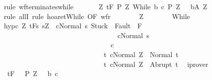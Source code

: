 \begin{isabellebody}
\ {\isacharparenleft}rule\ wf{\isacharunderscore}terminates{\isacharunderscore}while{\isacharparenright}\isanewline
\ \ \ \ \isamarkupfalse%
\ {\isachardoublequoteopen}{\isasymforall}\ Z{\isachardot}\ {\isasymGamma}{\isacharcomma}{\isasymTheta}{\isasymturnstile}\isactrlsub t\isactrlbsub {\isacharslash}F\isactrlesub \ {\isacharparenleft}{\isacharquery}P{\isacharprime}\ Z{\isacharparenright}\ {\isacharparenleft}While\ b\ c{\isacharparenright}\ {\isacharparenleft}{\isacharquery}P{\isacharprime}\ Z\ {\isasyminter}\ {\isacharminus}\ b{\isacharparenright}{\isacharcomma}{\isacharparenleft}{\isacharquery}A\ Z{\isacharparenright}{\isachardoublequoteclose}\isanewline
\ \ \ \ \isamarkupfalse%
\ {\isacharparenleft}rule\ allI{\isacharcomma}\ rule\ hoaret{\isachardot}While\ {\isacharbrackleft}OF\ wf{\isacharunderscore}r{\isacharbrackright}{\isacharparenright}\isanewline
\ \ \ \ \ \ \isamarkupfalse%
\ Z\isanewline
\ \ \ \ \ \ \isamarkupfalse%
\ While\ \isanewline
\ \ \ \ \ \ \isamarkupfalse%
\ hyp{\isacharunderscore}c{\isacharcolon}\ {\isachardoublequoteopen}{\isasymforall}Z{\isachardot}\ {\isasymGamma}{\isacharcomma}{\isasymTheta}{\isasymturnstile}\isactrlsub t\isactrlbsub {\isacharslash}F\isactrlesub {\isacharbraceleft}s{\isachardot}\ s{\isacharequal}Z\ {\isasymand}\ {\isasymGamma}{\isasymturnstile}{\isasymlangle}c{\isacharcomma}Normal\ s{\isasymrangle}\ {\isasymRightarrow}{\isasymnotin}{\isacharparenleft}{\isacharbraceleft}Stuck{\isacharbraceright}\ {\isasymunion}\ Fault\ {\isacharbackquote}\ {\isacharparenleft}{\isacharminus}F{\isacharparenright}{\isacharparenright}\ {\isasymand}\isanewline
\ \ \ \ \ \ \ \ \ \ \ \ \ \ \ \ \ \ \ \ \ \ \ \ \ \ \ \ \ \ \ \ \ \ {\isasymGamma}{\isasymturnstile}c{\isasymdown}Normal\ s{\isacharbraceright}\isanewline
\ \ \ \ \ \ \ \ \ \ \ \ \ \ \ \ \ \ \ \ \ \ \ \ \ \ \ \ \ \ \ \ c\isanewline
\ \ \ \ \ \ \ \ \ \ \ \ \ \ \ \ \ \ \ \ \ \ \ \ \ \ \ \ \ \ {\isacharbraceleft}t{\isachardot}\ {\isasymGamma}{\isasymturnstile}{\isasymlangle}c{\isacharcomma}Normal\ Z{\isasymrangle}\ {\isasymRightarrow}\ Normal\ t{\isacharbraceright}{\isacharcomma}\isanewline
\ \ \ \ \ \ \ \ \ \ \ \ \ \ \ \ \ \ \ \ \ \ \ \ \ \ \ \ \ \ {\isacharbraceleft}t{\isachardot}\ {\isasymGamma}{\isasymturnstile}{\isasymlangle}c{\isacharcomma}Normal\ Z{\isasymrangle}\ {\isasymRightarrow}\ Abrupt\ t{\isacharbraceright}{\isachardoublequoteclose}\ \isamarkupfalse%
\ iprover\isanewline
\ \ \ \ \ \ \isamarkupfalse%
\ {\isachardoublequoteopen}{\isasymforall}{\isasymsigma}{\isachardot}\ {\isasymGamma}{\isacharcomma}{\isasymTheta}{\isasymturnstile}\isactrlsub t\isactrlbsub {\isacharslash}F\isactrlesub \ {\isacharparenleft}{\isacharbraceleft}{\isasymsigma}{\isacharbraceright}\ {\isasyminter}\ {\isacharquery}P{\isacharprime}\ Z\ \ {\isasyminter}\ b{\isacharparenright}\ c\ \isanewline

\end{isabellebody}

